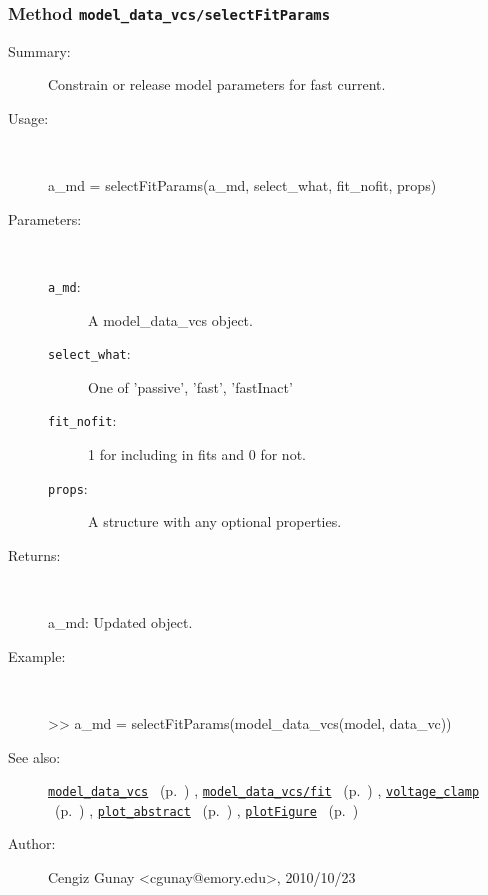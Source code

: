 \subsubsection[Method \texttt{selectFitParams}]{Method \texttt{model\_data\_vcs/selectFitParams}}%
%
\label{ref_model_data_vcs__selectFitParams}%
\hypertarget{ref_model_data_vcs__selectFitParams}{}%
\begin{description}
\item[Summary:]Constrain or release model parameters for fast current.
%
\item[Usage:]~%
\begin{lyxcode}%
a\_md = selectFitParams(a\_md, select\_what, fit\_nofit, props)
%
\end{lyxcode}%
%
%
\item[Parameters:]~
\begin{description}%
\item[\texttt{a\_md}:]
 A model\_data\_vcs object.
\item[\texttt{select\_what}:]
 One of 'passive', 'fast', 'fastInact'
\item[\texttt{fit\_nofit}:]
 1 for including in fits and 0 for not.
\item[\texttt{props}:]
 A structure with any optional properties.
\end{description}%
%
\item[Returns:
]~

   a\_md: Updated object.
%
\item[Example:]~
\begin{lyxcode} >> a\_md = selectFitParams(model\_data\_vcs(model, data\_vc))
\\%
\end{lyxcode}
%
\item[See also:]%
\hyperlink{ref_model_data_vcs}{\texttt{model\_data\_vcs}}%
\ (p.~\pageref{ref_model_data_vcs})%
%
, \hyperlink{ref_model_data_vcs__fit}{\texttt{model\_data\_vcs/fit}}%
\ (p.~\pageref{ref_model_data_vcs__fit})%
%
, \hyperlink{ref_voltage_clamp}{\texttt{voltage\_clamp}}%
\ (p.~\pageref{ref_voltage_clamp})%
%
, \hyperlink{ref_plot_abstract}{\texttt{plot\_abstract}}%
\ (p.~\pageref{ref_plot_abstract})%
%
, \hyperlink{ref_plotFigure}{\texttt{plotFigure}}%
\ (p.~\pageref{ref_plotFigure})%
%
%
\item[Author:]%
Cengiz Gunay <cgunay@emory.edu>, 2010/10/23
%
\end{description}
\methodline%
